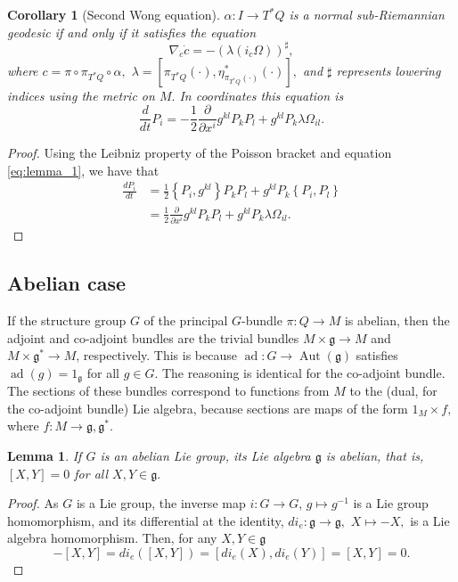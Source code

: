 \documentclass[12pt, letterpaper, reqno]{amsart}
\theoremstyle{definition}
\theoremstyle{plain}
\newtheorem{lm}{Lemma}
\newtheorem{cor}{Corollary}
\theoremstyle{remark}
\begin{document}
\begin{cor}[Second Wong equation]\label{cor:swe}
	$ \alpha: I \rightarrow T^*Q $ is a normal sub-Riemannian geodesic if and only if it satisfies the equation
	$$ \nabla_{\dot{c}}\dot{c} = -( \lambda(i_{\dot{c}}\Omega))^{\sharp}, $$ 
	where $ c = \pi\circ\pi_{T^*Q}\circ\alpha, $ $\lambda = [\pi_{T^*Q}(\cdot), \eta^*_{\pi_{T^*Q}(\cdot)}(\cdot)], $ and $ \sharp $ represents lowering indices using the metric on $ M. $ In coordinates this equation is
	$$ \frac{d}{dt} P_i = - \frac{1}{2} \frac{\partial }{\partial x^i} g^{kl}P_kP_l + g^{kl}P_k \lambda \Omega_{il}. $$ 
\end{cor}
\begin{proof}
	Using the Leibniz property of the Poisson bracket and equation \eqref{eq:lemma_1}, we have that
	\begin{align*}
		\frac{d P_i}{dt} &= \frac{1}{2} \left\{ P_i, g^{kl} \right\} P_kP_l+ g^{kl} P_k \left\{ P_i, P_l \right\} \\&= \frac{1}{2} \frac{\partial }{\partial x^i} g^{kl} P_k P_l + g^{kl} P_k\lambda \Omega_{il}.
	\end{align*}
\end{proof}
 
\subsection{Abelian case}%
\label{sub:abelian_case}

If the structure group $ G $ of the principal $ G $-bundle $ \pi: Q \rightarrow M $ is abelian, then the adjoint and co-adjoint bundles are the trivial bundles $ M\times \mathfrak{g} \rightarrow M $ and $M\times \mathfrak{g}^* \rightarrow M$, respectively. This is because $ \operatorname{ad} : G \rightarrow \operatorname{Aut} ( \mathfrak{g}) $ satisfies $ \operatorname{ad} (g)= 1_{ \mathfrak{g}} $ for all $ g\in G $. The reasoning is identical for the co-adjoint bundle. The sections of these bundles correspond to functions from $M$ to the (dual, for the co-adjoint bundle) Lie algebra, because sections are maps of the form $ 1_M\times f, $ where $ f: M \rightarrow \mathfrak{g}, \mathfrak{g}^*.$  

\begin{lm}\label{lm:minus_inverse}
	If $ G $ is an abelian Lie group, its Lie algebra $ \mathfrak{g} $ is abelian, that is, $ [X,Y]=0 $ for all $ X,Y\in \mathfrak{g}. $ 
\end{lm}
\begin{proof}
	As $ G $ is a Lie group, the inverse map $ i : G \rightarrow G $, $ g \mapsto g^{-1} $ is a Lie group homomorphism, and its differential at the identity, $di_e: \mathfrak{g} \rightarrow \mathfrak{g},  $ $ X \mapsto -X, $ is a Lie algebra homomorphism. Then, for any $ X,Y\in \mathfrak{g} $ 
	$$ -[X,Y] = di_e([X,Y]) = [di_e(X), di_e(Y)] = [X,Y]=0. $$ 
\end{proof}
\end{document}
